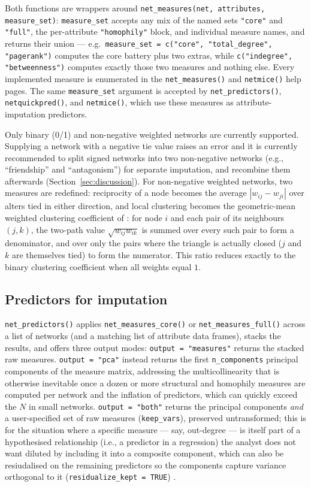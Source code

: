 \documentclass[11pt,a4paper]{article}
\newcommand{\code}[1]{\texttt{#1}}
\begin{document}
Both functions are wrappers around  \code{net\_measures(net, attributes, measure\_set)}: \code{measure\_set}
accepts any mix of the named sets \code{"core"} and \code{"full"}, the
per-attribute \code{"homophily"} block, and individual measure names, and
returns their union --- e.g.\ \code{measure\_set = c("core",
"total\_degree", "pagerank")} computes the core battery plus two extras,
while \code{c("indegree", "betweenness")} computes exactly those two
measures and nothing else.
Every implemented measure is enumerated in the \code{net\_measures()} and
\code{netmice()} help pages. The same \code{measure\_set} argument is
accepted by \code{net\_predictors()}, \code{netquickpred()}, and
\code{netmice()}, which use these measures as attribute-imputation
predictors.

Only binary (0/1) and non-negative weighted networks are currently
supported. Supplying a network with a negative tie value raises an
error and it is currently recommended to split signed networks into two non-negative networks (e.g., ``friendship'' and
``antagonism'') for separate imputation, and recombine them afterwards
(Section~\ref{sec:discussion}). For non-negative weighted networks, two
measures are redefined:
reciprocity of a node becomes the average $|w_{ij} - w_{ji}|$ over alters tied in
either direction, and local clustering becomes the geometric-mean
weighted clustering coefficient of \citet{OpsahlPanzarasa2009}: for node
$i$ and each pair of its neighbours $(j,k)$, the two-path value
$\sqrt{w_{ij} w_{ik}}$ is summed over every such pair to form a denominator,
and over only the pairs where the triangle is actually closed ($j$ and $k$
are themselves tied) to form the numerator. This ratio reduces exactly to
the  binary clustering coefficient when all weights equal $1$.

\subsection{Predictors for imputation}
\label{sec:predictors}

\code{net\_predictors()} applies \code{net\_measures\_core()} or
\code{net\_measures\_full()} across a list of networks (and a matching list
of attribute data frames), stacks the results, and
offers three output modes: \code{output = "measures"} returns the stacked
raw measures. \code{output = "pca"} instead returns the first
\code{n\_components} principal components of the measure matrix, addressing the multicollinearity that is
otherwise inevitable once a dozen or more structural and homophily measures
are computed per network and the inflation of predictors, which can quickly exceed the $N$ in small networks. \code{output = "both"} returns the principal
components \emph{and} a user-specified set of raw measures
(\code{keep\_vars}), preserved untransformed; this is for the situation
where a specific measure --- say, out-degree --- is itself part of a
hypothesised relationship (i.e., a predictor in a regression) the analyst does
not want diluted by including it
into a composite component, which can also be resiudalised on the remaining predictors so the
components capture variance orthogonal to it (\code{residualize\_kept = TRUE}) .
\end{document}
